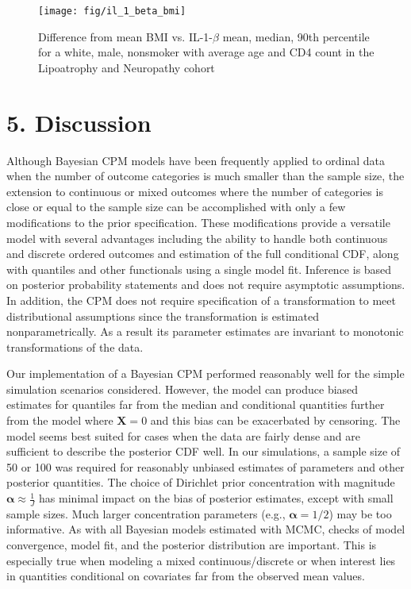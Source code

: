 \documentclass[
]{article}
\begin{document}
\begin{figure}

{\centering \texttt{[image: fig/il\_1\_beta\_bmi]} 

}

\caption{Difference from mean BMI vs. IL-1-$\beta$ mean, median, 90th percentile for a white, male, nonsmoker with average age and CD4 count in the Lipoatrophy and Neuropathy cohort}\label{fig:il-1-beta-bmi}
\end{figure}

\hypertarget{discussion}{%
\section{5. Discussion}\label{discussion}}

Although Bayesian CPM models have been frequently applied to ordinal data when the number of outcome categories is much smaller than the sample size, the extension to continuous or mixed outcomes where the number of categories is close or equal to the sample size can be accomplished with only a few modifications to the prior specification. These modifications provide a versatile model with several advantages including the ability to handle both continuous and discrete ordered outcomes and estimation of the full conditional CDF, along with quantiles and other functionals using a single model fit. Inference is based on posterior probability statements and does not require asymptotic assumptions. In addition, the CPM does not require specification of a transformation to meet distributional assumptions since the transformation is estimated nonparametrically. As a result its parameter estimates are invariant to monotonic transformations of the data.

Our implementation of a Bayesian CPM performed reasonably well for the simple simulation scenarios considered. However, the model can produce biased estimates
for quantiles far from the median and conditional quantities further from the model where \(\boldsymbol{X}=0\) and this bias can be exacerbated by censoring.
The model seems best suited for cases when the data are fairly dense and are sufficient to describe the posterior CDF well. In our simulations, a sample size of 50 or 100 was required for reasonably unbiased estimates of parameters and other posterior quantities. The choice of Dirichlet prior concentration with magnitude \(\boldsymbol{\alpha} \approx \frac{1}{J}\) has minimal impact on the bias of posterior estimates, except with small sample sizes. Much larger concentration parameters (e.g., \(\boldsymbol{\alpha}=1/2\)) may be too informative. As with all Bayesian models estimated with MCMC, checks of model convergence, model fit, and the posterior distribution are important. This is especially true when modeling a mixed continuous/discrete or when interest lies in quantities conditional on covariates far from the observed mean values.
\end{document}
